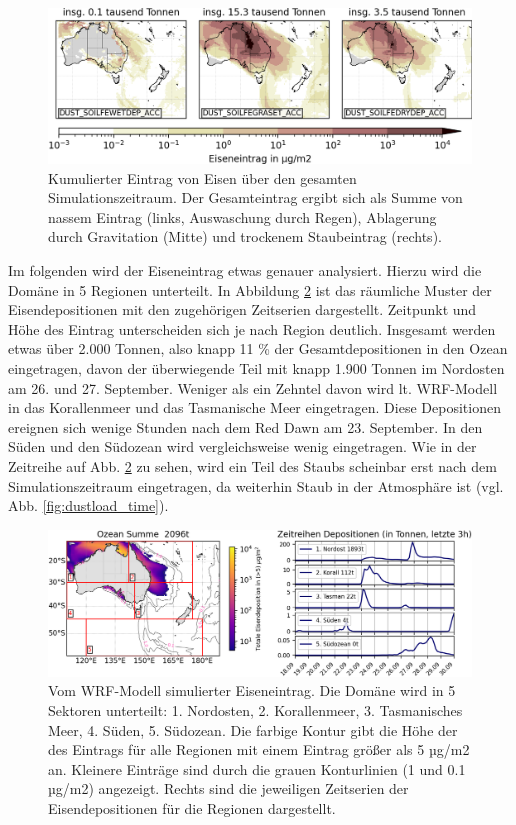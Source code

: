 \documentclass[12pt,a4paper,onecolumn]{scrartcl}
\begin{document}
\begin{figure}
\includegraphics[width=\textwidth]{bilder/iron_deposition_vars.png}
\caption{Kumulierter Eintrag von Eisen über den gesamten Simulationszeitraum. Der Gesamteintrag ergibt sich als Summe von nassem Eintrag (links, Auswaschung durch Regen), Ablagerung durch Gravitation (Mitte) und trockenem Staubeintrag (rechts).} \label{fig:iron_deposition}
\end{figure}
Im folgenden wird der Eiseneintrag etwas genauer analysiert. Hierzu wird die Domäne in 5 Regionen unterteilt. In Abbildung \ref{fig:iron_deposition_sections} ist das räumliche Muster der Eisendepositionen mit den zugehörigen Zeitserien dargestellt. Zeitpunkt und Höhe des Eintrag unterscheiden sich je nach Region deutlich. Insgesamt werden etwas über 2.000 Tonnen, also knapp 11 \% der Gesamtdepositionen in den Ozean eingetragen, davon der überwiegende Teil mit knapp 1.900 Tonnen im Nordosten am 26. und 27. September. Weniger als ein Zehntel davon wird lt. WRF-Modell in das Korallenmeer und das Tasmanische Meer eingetragen. Diese Depositionen ereignen sich wenige Stunden nach dem Red Dawn am 23. September. In den Süden und den Südozean wird vergleichsweise wenig eingetragen. Wie in der Zeitreihe auf Abb. \ref{fig:iron_deposition_sections} zu sehen, wird ein Teil des Staubs scheinbar erst nach dem Simulationszeitraum eingetragen, da weiterhin Staub in der Atmosphäre ist (vgl. Abb. \ref{fig:dustload_time}).
\begin{figure}
\includegraphics[width=\textwidth]{bilder/total_iron.png}
\caption{Vom WRF-Modell simulierter Eiseneintrag. Die Domäne wird in 5 Sektoren unterteilt: 1. Nordosten, 2. Korallenmeer, 3. Tasmanisches Meer, 4. Süden, 5. Südozean. Die farbige Kontur gibt die Höhe der des Eintrags für alle Regionen mit einem Eintrag größer als 5 µg/m2 an. Kleinere Einträge sind durch die grauen Konturlinien (1 und 0.1 µg/m2) angezeigt. Rechts sind die jeweiligen Zeitserien der Eisendepositionen für die Regionen dargestellt.} \label{fig:iron_deposition_sections}
\end{figure}
\end{document}
